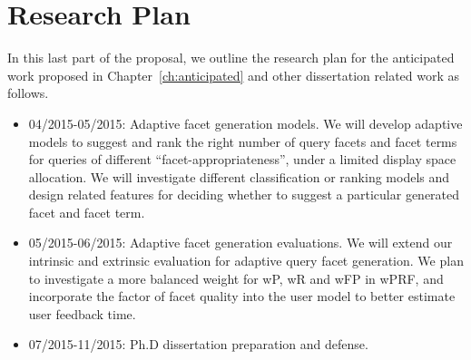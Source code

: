 \chapter{Research Plan}
In this last part of the proposal, we outline the research plan for the anticipated work proposed in Chapter~\ref{ch:anticipated} and other dissertation related work as follows.

\begin{itemize}
 \item 04/2015-05/2015: Adaptive facet generation models. We will develop adaptive models to suggest and rank the right number of query facets and facet terms for queries of different ``facet-appropriateness'', under a limited display space allocation. We will investigate different classification or ranking models and design related features for deciding whether to suggest a particular generated facet and facet term.
 \item 05/2015-06/2015: Adaptive facet generation evaluations. We will extend our intrinsic and extrinsic evaluation for adaptive query facet generation. We plan to investigate a more balanced weight for wP, wR and wFP in wPRF, and incorporate the factor of facet quality into the user model to better estimate user feedback time.
 \item 07/2015-11/2015: Ph.D dissertation preparation and defense.
\end{itemize}
